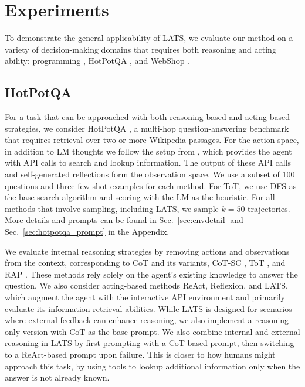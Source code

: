 \documentclass{article} \usepackage{iclr2024_conference,times}
\begin{document}
\section{Experiments}

To demonstrate the general applicability of LATS, we evaluate our method on a variety of decision-making domains that requires both reasoning and acting ability: programming \citep{chen2021evaluating, austin2021program}, HotPotQA \citep{yang2018hotpotqa}, and WebShop \citep{yao2022webshop}.

\subsection{HotPotQA}

For a task that can be approached with both reasoning-based and acting-based strategies, we consider HotPotQA \citep{yang2018hotpotqa}, a multi-hop question-answering benchmark that requires retrieval over two or more Wikipedia passages. For the action space, in addition to LM thoughts we follow the setup from \citet{yao2023react}, which provides the agent with API calls to search and lookup information. The output of these API calls and self-generated reflections form the observation space. We use a subset of 100 questions and three few-shot examples for each method. For ToT, we use DFS as the base search algorithm and scoring with the LM as the heuristic. For all methods that involve sampling, including LATS, we sample $k = 50$ trajectories. More details and prompts can be found in Sec.~\ref{sec:envdetail} and Sec.~\ref{sec:hotpotqa_prompt} in the Appendix.

We evaluate internal reasoning strategies by removing actions and observations from the context, corresponding to CoT \citep{wei2022chain} and its variants, CoT-SC \citep{wang2022self}, ToT \citep{yao2023tree}, and RAP \citep{hao2023reasoning}. These methods rely solely on the agent's existing knowledge to answer the question. We also consider acting-based methods ReAct, Reflexion, and LATS, which augment the agent with the interactive API environment and primarily evaluate its information retrieval abilities. While LATS is designed for scenarios where external feedback can enhance reasoning, we also implement a reasoning-only version with CoT as the base prompt. We also combine internal and external reasoning in LATS by first prompting with a CoT-based prompt, then switching to a ReAct-based prompt upon failure. This is closer to how humans might approach this task, by using tools to lookup additional information only when the answer is not already known. 
\end{document}
